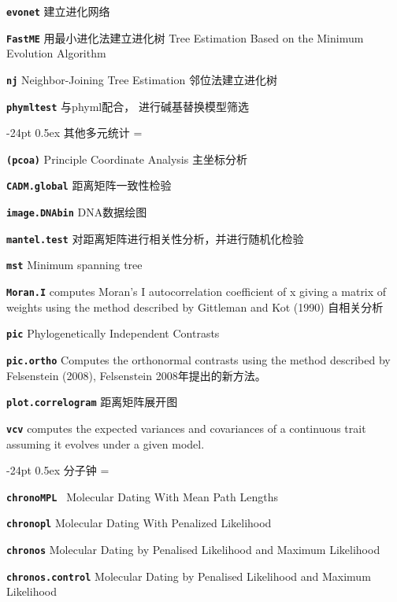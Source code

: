 \documentclass[10pt,landscape]{article}
\makeatletter
\renewcommand\section{\@startsection{section}{1}{0mm}%
                                     {-24pt}%
                                     {0.5ex}%
                                {\color{blue}\normalfont\large\bfseries}}
\newcommand{\bcode}[1]{\texttt{\textbf{#1}}}
\makeatother
\begin{document}
\begin{CJK}{UTF8}{gbsn}
\begin{multicols}{3}
\bcode{evonet} 建立进化网络

\bcode{FastME} 用最小进化法建立进化树 Tree Estimation Based on the Minimum Evolution Algorithm

\bcode{nj} Neighbor-Joining Tree Estimation 邻位法建立进化树

\bcode{phymltest} 与phyml配合， 进行碱基替换模型筛选

\section{其他多元统计}
\everypar={\hangindent=9mm}

\bcode{(pcoa)} Principle Coordinate Analysis 主坐标分析

\bcode{CADM.global} 距离矩阵一致性检验

\bcode{image.DNAbin}  DNA数据绘图

\bcode{mantel.test} 对距离矩阵进行相关性分析，并进行随机化检验

\bcode{mst} Minimum spanning tree

\bcode{Moran.I} computes Moran's I autocorrelation coefficient of x giving a matrix of weights using the method described by Gittleman and Kot (1990) 自相关分析

\bcode{pic} Phylogenetically Independent Contrasts

\bcode{pic.ortho} Computes the orthonormal contrasts using the method described by Felsenstein (2008), Felsenstein 2008年提出的新方法。

\bcode{plot.correlogram} 距离矩阵展开图

\bcode{vcv} computes the expected variances and covariances of a continuous trait assuming it evolves under a given model.

\section{分子钟}
\everypar={\hangindent=9mm}

\bcode{chronoMPL }   Molecular Dating With Mean Path Lengths

\bcode{chronopl}     Molecular Dating With Penalized Likelihood

\bcode{chronos}  Molecular Dating by Penalised Likelihood and Maximum Likelihood

\bcode{chronos.control}  Molecular Dating by Penalised Likelihood and Maximum Likelihood


\end{multicols}
\end{CJK}
\end{document}
